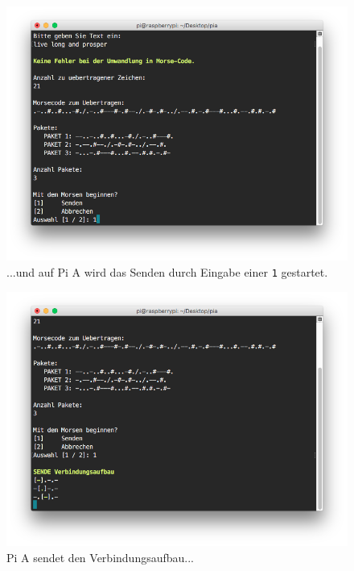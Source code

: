 \documentclass[12pt, a4paper]{article}
\begin{document}
\newpage
\begin{figure}[H]
	\centering
	\includegraphics[width=1.0\textwidth]{sshot_8.png}
	\caption{...und auf Pi A wird das Senden durch Eingabe einer \texttt{1} gestartet.}
\end{figure}

\newpage
\begin{figure}[H]
	\centering
	\includegraphics[width=1.0\textwidth]{sshot_10.png}
	\caption{Pi A sendet den Verbindungsaufbau...}
\end{figure}
\end{document}
